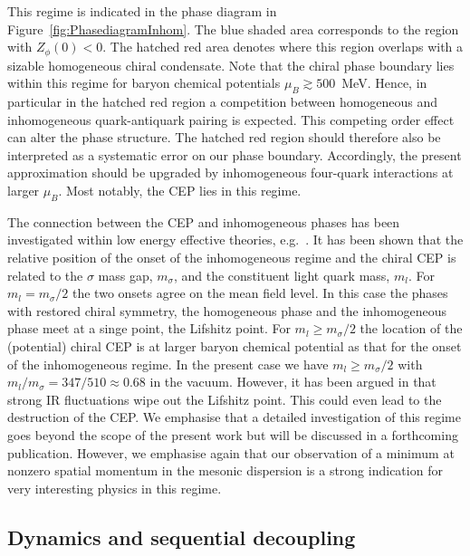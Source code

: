 \documentclass[%
reprint,
superscriptaddress,
showpacs,preprintnumbers,
 amsmath,amssymb,
 aps,
prd,
]{revtex4-1}
\def\fig#1{Figure~\ref{#1}}
\begin{document}
This regime is indicated in the phase diagram in
\fig{fig:PhasediagramInhom}. The blue shaded area corresponds to the
region with $Z_\phi(0) < 0$. The hatched red area denotes where this
region overlaps with a sizable homogeneous chiral condensate. Note
that the chiral phase boundary lies within this regime for baryon
chemical potentials $\mu_B\gtrsim 500$\, MeV. Hence, in particular in
the hatched red region a competition between homogeneous and
inhomogeneous quark-antiquark pairing is expected. This competing
order effect can alter the phase structure. The hatched red region
should therefore also be interpreted as a systematic error on our
phase boundary.  Accordingly, the present approximation should be
upgraded by inhomogeneous four-quark interactions at larger
$\mu_B$. Most notably, the CEP lies in this regime.

The connection between the CEP and inhomogeneous phases has been
investigated within low energy effective theories, e.g.\
\cite{Carignano:2014jla}. It has been shown that the relative position
of the onset of the inhomogeneous regime and the chiral CEP is related
to the $\sigma$ mass gap, $m_\sigma$, and the constituent light quark
mass, $m_l$. For $m_l= m_\sigma/2$ the two onsets agree on the mean
field level. In this case the phases with restored chiral symmetry,
the homogeneous phase and the inhomogeneous phase meet at a singe
point, the Lifshitz point. For $m_l\geq m_\sigma/2$ the location of
the (potential) chiral CEP is at larger baryon chemical potential as
that for the onset of the inhomogeneous regime. In the present case we
have $m_l\geq m_\sigma/2$ with $m_l/m_\sigma=347/510\approx 0.68$ in
the vacuum. However, it has been argued in \cite{Pisarski:2018bct}
that strong IR fluctuations wipe out the Lifshitz point. This could
even lead to the destruction of the CEP.  We emphasise that a detailed
investigation of this regime goes beyond the scope of the present work
but will be discussed in a forthcoming publication. However, we
emphasise again that our observation of a minimum at nonzero spatial
momentum in the mesonic dispersion is a strong indication for very
interesting physics in this regime.


\subsection{Dynamics and sequential
  decoupling}\label{sec:Props+Couplings}
\end{document}
